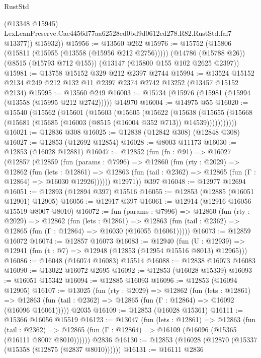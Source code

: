 \begin{lexlean}{RustStd}
\begin{coremodule}
            (@13348 @15945)
            LexLeanPreserve.Cae4456d77aa62528ed0bd9d0612cd278.R82.RustStd.fal7
            @13377))
        @15932))
@15956 := @13560 @262
@15976 := @15752
    (@15806 (@15811 (@15955 (@13558 (@15956 @212 @2756)))))
    (@14786 (@15788 @26))
    (@8515 (@15793 @712 @155))
    (@13147 (@15800 @155 @102 @2625 @2397))
@15981 := @13758 @15152 @329 @212 @2397 @2744
@15994 := @13524 @15152 @2134 @249 @212 @132 @11 @2397 @2374 @2742 @13252 (@13457 @15152 @2134)
@15995 := @13560 @249
@16003 := @15734 (@15976 (@15981 (@15994 (@13558 (@15995 @212 @2742))))) @14970
@16004 := @14975 @55
@16020 := @15540
    (@15562
      (@15601
        (@15603
          (@15605
            (@15622
              (@15638
                (@15655 (@15668 (@15681 (@15685 (@16003 (@8515 (@16004 @352 @713)) @14539)))))))))))
@16021 := @12836 @308
@16025 := @12838 (@12842 @308) (@12848 @308)
@16027 := @12853 (@12692 @12854)
@16028 := @8003 @11173
@16030 := @12853 (@16028 @12881)
@16047 := @12852
    (fun (fn : @91) =>
    @16027
      (@12857
        (@12859
          (fun (params : @7996) =>
          @12860
            (fun (rty : @2029) =>
            @12862
              (fun (lets : @12861) =>
              @12863 (fun (tail : @2362) => @12865 (fun (Γ : @12864) => @16030 @12926))))))
        @12971))
    @397
@16048 := @12977 @12694
@16051 := @12893 (@12894 @397) @15516
@16055 := @12853 (@12885 (@16051 @12901) @12905)
@16056 := @12917 @397
@16061 := @12914 (@12916 @16056 @15519 @8007 @8010)
@16072 := fun (params : @7996) =>
  @12860
    (fun (rty : @2029) =>
    @12862
      (fun (lets : @12861) =>
      @12863 (fun (tail : @2362) => @12865 (fun (Γ : @12864) => @16030 (@16055 @16061)))))
@16073 := @12859 @16072
@16074 := @12857 @16073
@16083 := @12940
    (fun (U : @12939) => @12941 (fun (t : @7) => @12948 (@12853 (@12954 @15516 @8013) @12965)))
@16086 := @16048 (@16074 @16083) @15514
@16088 := @12838 @16073 @16083
@16090 := @13022 @16072 @2695
@16092 := @12853 (@16028 @15339)
@16093 := @16051 @15342
@16094 := @12885 @16093
@16096 := @12853 (@16094 @12905)
@16107 := @13025
    (fun (rty : @2029) =>
    @12862
      (fun (lets : @12861) =>
      @12863 (fun (tail : @2362) => @12865 (fun (Γ : @12864) => @16092 (@16096 @16061)))))
    @2035
@16109 := @12853 (@16028 @15361)
@16111 := @15366 @16056 @15519
@16123 := @13047
    (fun (lets : @12861) =>
    @12863
      (fun (tail : @2362) =>
      @12865 (fun (Γ : @12864) => @16109 (@16096 (@15365 (@16111 @8007 @8010))))))
    @2836
@16130 := @12853 (@16028 (@12870 (@15337 (@15358 (@12875 (@2837 @8010))))))
@16131 := @16111 @2836

\end{coremodule}
\end{lexlean}
